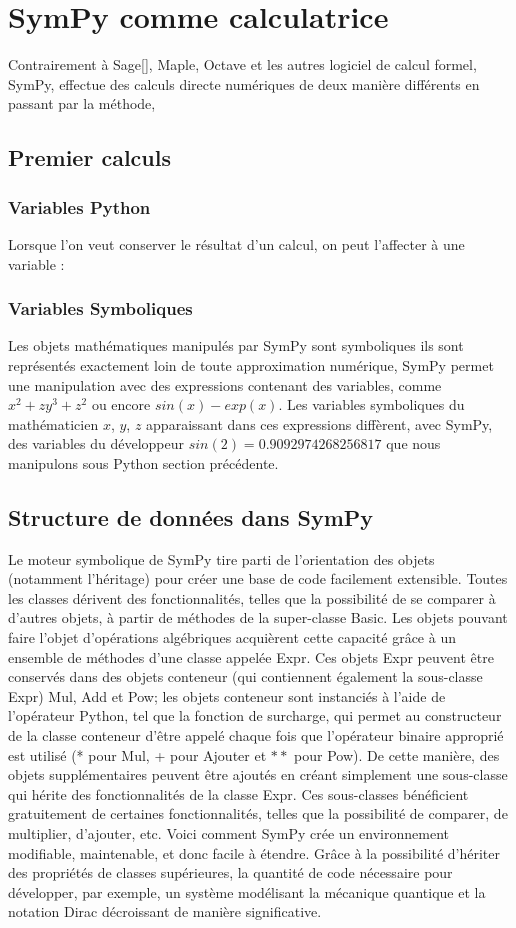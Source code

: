 \section{SymPy comme calculatrice}
Contrairement à Sage[], Maple, Octave et les autres logiciel de calcul formel, SymPy, effectue des calculs directe numériques de deux manière différents en passant par la méthode, 
\subsection{Premier calculs}
\subsubsection{Variables Python}
Lorsque l’on veut conserver le résultat d’un calcul, on peut l’affecter à une
variable :

\subsubsection{Variables Symboliques}
Les objets mathématiques manipulés par SymPy sont symboliques ils sont représentés exactement loin de 
toute approximation numérique, SymPy permet une manipulation avec des expressions contenant
des variables, comme $x^{2} + zy^{3} + z^{2}$ ou encore $sin(x) - exp(x)$. Les variables symboliques
du mathématicien $x$, $y$, $z$ apparaissant dans ces expressions diffèrent, avec SymPy,
des variables du développeur $sin(2) = 0.9092974268256817$ que nous manipulons sous Python 
section précédente. 


\subsection{Structure de données dans SymPy}
Le moteur symbolique de SymPy tire parti de l'orientation des objets (notamment l'héritage) pour créer une base de code facilement extensible. Toutes les classes dérivent des fonctionnalités, telles que la possibilité de se comparer à d'autres objets, à partir de méthodes de la super-classe Basic. Les objets pouvant faire l'objet d'opérations algébriques acquièrent cette capacité grâce à un ensemble de méthodes d'une classe appelée Expr. Ces objets Expr peuvent être conservés dans des objets conteneur (qui contiennent également la sous-classe Expr) Mul, Add et Pow; les objets conteneur sont instanciés à l'aide de l'opérateur Python, tel que la fonction de surcharge, qui permet au constructeur de la classe conteneur d'être appelé chaque fois que l'opérateur binaire approprié est utilisé (* pour Mul, + pour Ajouter et $**$ pour Pow).
De cette manière, des objets supplémentaires peuvent être ajoutés en créant simplement une sous-classe qui hérite des fonctionnalités de la classe Expr. Ces sous-classes bénéficient gratuitement de certaines fonctionnalités, telles que la possibilité de comparer, de multiplier, d’ajouter, etc. Voici comment SymPy crée un environnement modifiable, maintenable, et donc facile à étendre. Grâce à la possibilité d'hériter des propriétés de classes supérieures, la quantité de code nécessaire pour développer, par exemple, un système modélisant la mécanique quantique et la notation Dirac décroissant de manière significative.
